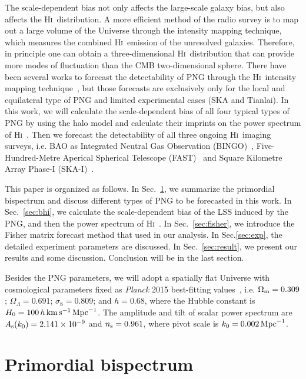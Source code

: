 \documentclass[twocolumn,floatfix,nofootinbib,aps,reprint]{revtex4}
\def\hi{\textsc{Hi~}}
\begin{document}
The scale-dependent bias not only affects the 
large-scale galaxy bias, but also affects the \hi distribution. A more efficient method of the radio survey is to map out a large volume of the Universe through the intensity mapping technique, which measures the combined \hi emission of
the unresolved galaxies. Therefore, in principle one can obtain a three-dimensional \hi distribution that can provide more modes of fluctuation than the CMB two-dimensional sphere. There have been several works to forecast the detectability of PNG through the \hi intensity mapping technique~\cite{2013PhRvL.111q1302C, 2015ApJ...798...40X,Bull15}, but those forecasts are exclusively only for the local and equilateral type of PNG and limited experimental cases (SKA and Tianlai). In this work, we will calculate the scale-dependent bias of all four typical types of PNG by using the halo model and calculate their imprints on the power spectrum of \hi. Then we forecast the detectability of all three ongoing \hi imaging surveys, i.e. BAO as Integrated Neutral Gas Observation (BINGO)~\cite{2013MNRAS.434.1239B}, Five-Hundred-Metre Aperical Spherical Telescope (FAST)~\cite{2011IJMPD..20..989N,2016RaSc...51.1060L} and Square Kilometre Array Phase-I (SKA-I)~\cite{2009IEEEP..97.1482D}.

This paper is organized as follows. In Sec.~\ref{sec:power-bispec}, we 
summarize the primordial bispectrum and 
discuss different types of PNG to be forecasted in this work. 
In Sec.~\ref{sec:bhi}, we calculate the 
scale-dependent bias of the LSS induced by the PNG, and then the power 
spectrum of \hi. In Sec.~\ref{sec:fisher}, we introduce the Fisher matrix 
forecast method that used in our analysis. In Sec.\ref{sec:exp}, 
the detailed experiment
parameters are discussed. In Sec.~\ref{sec:result}, we present 
our results and some discussion. Conclusion will be in the last section.

Besides the PNG parameters, we will adopt a spatially flat Universe with cosmological parameters fixed as {\it Planck} 2015 best-fitting values~\cite{Planck2015-parameter}, i.e. $\Omega_{\rm m}=0.309$; $\Omega_{\Lambda} = 0.691$; $\sigma_{8} = 0.809$; and $h = 0.68$, where the Hubble constant is $H_{0} = 100\,h\,{\rm km}\,{\rm s}^{-1}\,{\rm Mpc}^{-1}$. The amplitude and tilt of scalar power spectrum are $A_{\rm s}(k_{0})=2.141 \times 10^{-9}$ and $n_{\rm s}=0.961$, where pivot scale is $k_{0}=0.002\,{\rm Mpc}^{-1}$.

\section{Primordial bispectrum}
\label{sec:power-bispec}
\end{document}
